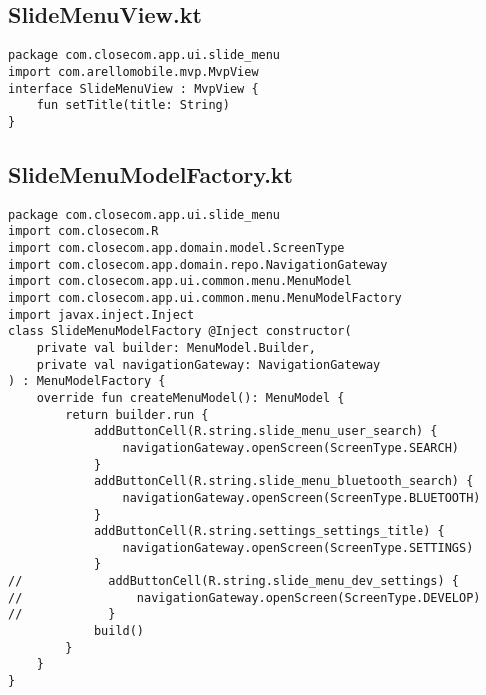 \documentclass[listing]{espd}
\begin{document}
\subsection{SlideMenuView.kt}
\begin{verbatim}
package com.closecom.app.ui.slide_menu
import com.arellomobile.mvp.MvpView
interface SlideMenuView : MvpView {
    fun setTitle(title: String)
}
\end{verbatim}

\subsection{SlideMenuModelFactory.kt}
\begin{verbatim}
package com.closecom.app.ui.slide_menu
import com.closecom.R
import com.closecom.app.domain.model.ScreenType
import com.closecom.app.domain.repo.NavigationGateway
import com.closecom.app.ui.common.menu.MenuModel
import com.closecom.app.ui.common.menu.MenuModelFactory
import javax.inject.Inject
class SlideMenuModelFactory @Inject constructor(
    private val builder: MenuModel.Builder,
    private val navigationGateway: NavigationGateway
) : MenuModelFactory {
    override fun createMenuModel(): MenuModel {
        return builder.run {
            addButtonCell(R.string.slide_menu_user_search) {
                navigationGateway.openScreen(ScreenType.SEARCH)
            }
            addButtonCell(R.string.slide_menu_bluetooth_search) {
                navigationGateway.openScreen(ScreenType.BLUETOOTH)
            }
            addButtonCell(R.string.settings_settings_title) {
                navigationGateway.openScreen(ScreenType.SETTINGS)
            }
//            addButtonCell(R.string.slide_menu_dev_settings) {
//                navigationGateway.openScreen(ScreenType.DEVELOP)
//            }
            build()
        }
    }
}
\end{verbatim}
\end{document}
